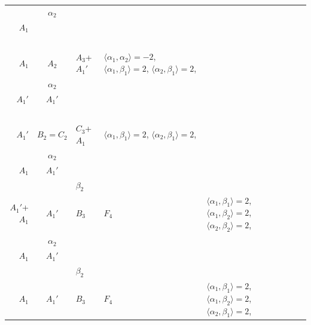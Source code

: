 \documentclass[12pt]{report}
\begin{document}
\begin{appendix}
{\begin{longtable}{rcl p{1cm}p{1cm}p{3cm} }
\\
\begin{tabular}{cc}$\alpha_1$+ & $\alpha_2$\\\tiny{ $A_1$ } & \tiny{  }\end{tabular} &\begin{tabular}{c} = \\~ \end{tabular} & \begin{tabular}{c}$\beta_1$\\\tiny{ $A_1$ }\end{tabular} & $A_2$ & $A_3$+$A_1'$ & $\langle\alpha_1, \alpha_2\rangle=-2$,  $\langle\alpha_1, \beta_1\rangle=2$, $\langle\alpha_2, \beta_1\rangle=2$, 
\\
\begin{tabular}{cc}$\alpha_1$+ & $\alpha_2$\\\tiny{ $A_1'$ } & \tiny{ $A_1'$ }\end{tabular} &\begin{tabular}{c} = \\~ \end{tabular} & \begin{tabular}{c}$\beta_1$\\\tiny{ $A_1'$ }\end{tabular} & $B_2=C_2$ & $C_3$+$A_1$ &  $\langle\alpha_1, \beta_1\rangle=2$, $\langle\alpha_2, \beta_1\rangle=2$, 
\\
\begin{tabular}{cc}$\alpha_1$+ & $\alpha_2$\\\tiny{ $A_1$ } & \tiny{ $A_1'$ }\end{tabular} &\begin{tabular}{c} = \\~ \end{tabular} & \begin{tabular}{cc}$\beta_1$+ & $\beta_2$\\\tiny{ $A_1'$+$A_1$ } & \tiny{ $A_1'$ }\end{tabular} & $B_3$ & $F_4$ &  $\langle\alpha_1, \beta_1\rangle=2$, $\langle\alpha_1, \beta_2\rangle=2$, $\langle\alpha_2, \beta_2\rangle=2$, 
\\
\begin{tabular}{cc}$\alpha_1$+ & $\alpha_2$\\\tiny{ $A_1$ } & \tiny{ $A_1'$ }\end{tabular} &\begin{tabular}{c} = \\~ \end{tabular} & \begin{tabular}{cc}$\beta_1$+ & $\beta_2$\\\tiny{ $A_1$ } & \tiny{ $A_1'$ }\end{tabular} & $B_3$ & $F_4$ &  $\langle\alpha_1, \beta_1\rangle=2$, $\langle\alpha_1, \beta_2\rangle=2$, $\langle\alpha_2, \beta_1\rangle=2$, 

\end{longtable}}
\end{appendix}
\end{document}
